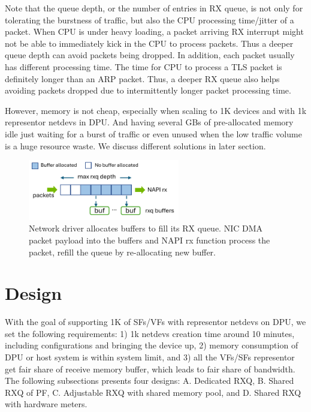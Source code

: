 \documentclass[letterpaper]{article}
\begin{document}
Note that the queue depth, or the number of entries in RX queue, is
not only for tolerating the burstness of traffic, but also the CPU
processing time/jitter of a packet. When CPU is under heavy loading,
a packet arriving RX interrupt might not be able to immediately
kick in the CPU to process packets. Thus a deeper queue depth can
avoid packets being dropped.
In addition, each packet usually has different processing time.
The time for CPU to process a TLS packet is definitely longer than
an ARP packet. Thus, a deeper RX queue also helps avoiding packets
dropped due to intermittently longer packet processing time.

However, memory is not cheap, especially when scaling to 1K devices
and with 1k representor netdevs in DPU. And having several GBs of
pre-allocated memory idle just waiting for a burst of traffic
or even unused when the low traffic volume is a huge resource waste.
We discuss different solutions in later section.

\begin{figure}[t!]
\includegraphics[width=2.6in]{rxq.pdf}
\centering
\caption{Network driver allocates buffers to fill its RX queue. NIC DMA packet
payload into the buffers and NAPI rx function process the packet, refill the 
queue by re-allocating new buffer.}
\label{fig:rxq}
\end{figure}

\section{Design}
With the goal of supporting 1K of SFs/VFs with representor netdevs
on DPU, we set the following requirements: 1) 1k netdevs creation time
around 10 minutes, including configurations and bringing the device up,
2) memory consumption of DPU or host system is within
system limit, and 3) all the VFs/SFs representor get fair share
of receive memory buffer, which leads to fair share of bandwidth.
The following subsections presents four designs: A. Dedicated RXQ,
B. Shared RXQ of PF, C. Adjustable RXQ with shared memory pool, and
D. Shared RXQ with hardware meters.
\end{document}
